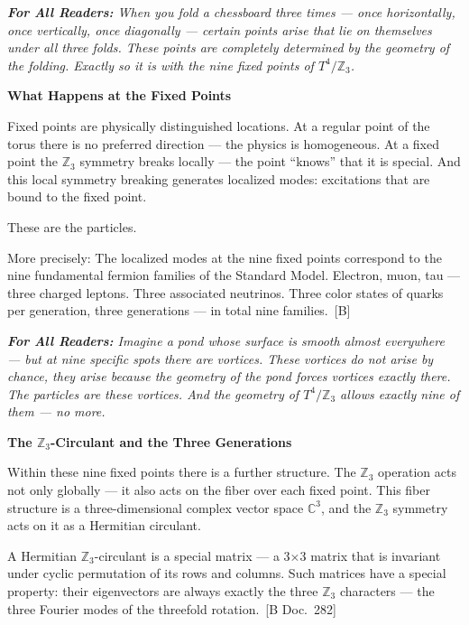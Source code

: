 \documentclass[11pt,oneside]{book}
\newcommand{\status}[1]{\penalty10000\,{\scriptsize\textcolor{gray!60}{[#1]}}}
\newenvironment{laierspur}{%
  \par\vspace{4pt}%
  \noindent\small\itshape\color{blue!60!black}%
  \textbf{For All Readers:}\enspace\ignorespaces}{%
  \par\vspace{4pt}\normalsize\normalfont\normalcolor}
\begin{document}
\begin{laierspur}
When you fold a chessboard three times — once horizontally, once
vertically, once diagonally — certain points arise that lie on themselves
under all three folds. These points are completely determined by the
geometry of the folding. Exactly so it is with the nine fixed points of
$T^4/\mathbb{Z}_3$.
\end{laierspur}

\textbf{What Happens at the Fixed Points}

Fixed points are physically distinguished locations. At a regular point of
the torus there is no preferred direction — the physics is homogeneous. At a
fixed point the $\mathbb{Z}_3$ symmetry breaks locally — the point \enquote{knows} that it is
special. And this local symmetry breaking generates localized modes:
excitations that are bound to the fixed point.

These are the particles.

More precisely: The localized modes at the nine fixed points correspond to
the nine fundamental fermion families of the Standard Model. Electron, muon,
tau — three charged leptons. Three associated neutrinos. Three color states
of quarks per generation, three generations — in total nine families. \status{B}

\begin{laierspur}
Imagine a pond whose surface is smooth almost everywhere — but at nine
specific spots there are vortices. These vortices do not arise by chance,
they arise because the geometry of the pond forces vortices exactly there.
The particles are these vortices. And the geometry of $T^4/\mathbb{Z}_3$ allows
exactly nine of them — no more.
\end{laierspur}

\textbf{The $\mathbb{Z}_3$-Circulant and the Three Generations}

Within these nine fixed points there is a further structure. The
$\mathbb{Z}_3$ operation acts not only globally — it also acts on the fiber over
each fixed point. This fiber structure is a three-dimensional complex vector
space $\mathbb{C}^3$, and the $\mathbb{Z}_3$ symmetry acts on it as a Hermitian
circulant.

A Hermitian $\mathbb{Z}_3$-circulant is a special matrix — a 3$\times$3 matrix that is
invariant under cyclic permutation of its rows and columns. Such matrices
have a special property: their eigenvectors are always exactly the three
$\mathbb{Z}_3$ characters — the three Fourier modes of the threefold rotation. \status{B Doc.~282}
\end{document}

